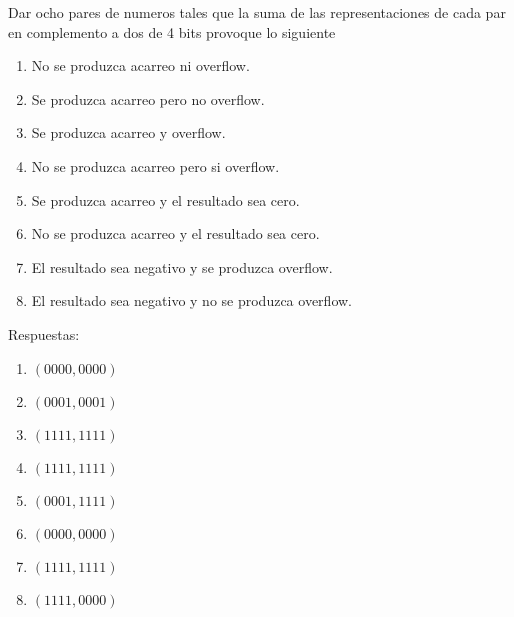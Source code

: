 \begin{enunciado}{\ejercicio}

Dar ocho pares de numeros tales que la suma de las representaciones de cada
par en complemento a dos de 4 bits provoque lo siguiente
\begin{enumerate}
    \item No se produzca acarreo ni overflow.
    \item Se produzca acarreo pero no overflow.
    \item Se produzca acarreo y overflow.
    \item No se produzca acarreo pero si overflow.
    \item Se produzca acarreo y el resultado sea cero.
    \item No se produzca acarreo y el resultado sea cero.
    \item El resultado sea negativo y se produzca overflow.
    \item El resultado sea negativo y no se produzca overflow.


\end{enumerate}

Respuestas: 

\begin{enumerate}
    \item $(0000, 0000)$
    \item $(0001, 0001)$
    \item $(1111, 1111)$
    \item $(1111, 1111)$
    \item $(0001, 1111)$
    \item $(0000, 0000)$
    \item $(1111, 1111)$
    \item $(1111, 0000)$


\end{enumerate}
\end{enunciado}
